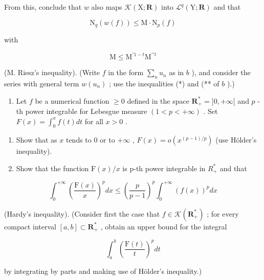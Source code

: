 From this, conclude that \(w\) also maps \(\mathcal{K}(\mathrm{X};\mathbf{R})\) into \(\mathcal{L}^q (\mathrm{Y};\mathbf{R})\) and that

\[
\mathrm{N} _ {q} (w (f)) \leqslant \mathrm{M} \cdot \mathrm{N} _ {p} (f)
\]

with

\[
\mathrm{M} \leqslant \mathrm{M} ^ {\prime 1 - t} \mathrm{M} ^ {\prime \prime t}
\]

(M. Riesz's inequality). (Write \(f\) in the form \(\sum_{n} u_n\) as in \(b\) ), and consider the series with general term \(w(u_n)\) ; use the inequalities (*) and (** of \(b\) ).)

\begin{enumerate}
\def\labelenumi{\arabic{enumi})}
\setcounter{enumi}{18}
\tightlist
\item
  Let \(f\) be a numerical function \(\geqslant 0\) defined in the space \(\mathbf{R}_+^* = ]0, +\infty[\) and \(p\) -th power integrable for Lebesgue measure \((1 < p < +\infty)\) . Set \(F(x) = \int_0^x f(t) dt\) for all \(x > 0\) .
\end{enumerate}

\begin{enumerate}
\def\labelenumi{\alph{enumi})}
\item
  Show that as \(x\) tends to 0 or to \(+\infty\) , \(F(x) = o(x^{(p - 1) / p})\) (use Hölder's inequality).
\item
  Show that the function \(\mathrm{F}(x)/x\) is p-th power integrable in \(R_{+}^{*}\) and that
\end{enumerate}

\[
\int_ {0} ^ {+ \infty} \left(\frac {\mathrm{F} (x)}{x}\right) ^ {p} d x \leqslant \left(\frac {p}{p - 1}\right) ^ {p} \int_ {0} ^ {+ \infty} (f (x)) ^ {p} d x
\]

(Hardy's inequality). (Consider first the case that \(f \in \mathcal{K}(\mathbf{R}_+^*)\) ; for every compact interval \([a, b] \subset \mathbf{R}_+^*\) , obtain an upper bound for the integral

\[
\int_ {a} ^ {b} \left(\frac {\mathrm{F} (t)}{t}\right) ^ {p} d t
\]

by integrating by parts and making use of Hölder's inequality.)


